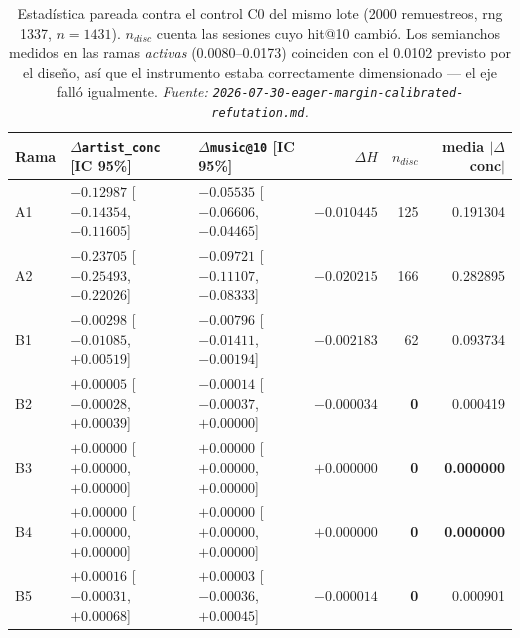 \documentclass[11pt]{article}
\newcommand{\best}[1]{\textbf{#1}}
\begin{document}
\begin{table}[ht]
  \centering
  \caption{Estadística pareada contra el control C0 del mismo lote (\num{2000}
  remuestreos, rng \num{1337}, $n=\num{1431}$). $n_{disc}$ cuenta las sesiones cuyo
  hit@10 cambió. Los semianchos medidos en las ramas \emph{activas}
  (\numrange{0.0080}{0.0173}) coinciden con el \num{0.0102} previsto por el
  diseño, así que el instrumento estaba correctamente dimensionado --- el eje
  falló igualmente.
  \emph{Fuente: \texttt{2026-07-30-eager-margin-calibrated-refutation.md}.}}
  \label{tab:nexttrack-eagermargin-paired}
  {\footnotesize\setlength{\tabcolsep}{4.5pt}\begin{tabular}{lllrrr}
    \toprule
    Rama & $\Delta$\texttt{artist\_conc} [IC 95\%] & $\Delta$\texttt{music@10} [IC 95\%] & $\Delta H$ & $n_{disc}$ & media $|\Delta$conc$|$ \\
    \midrule
    A1 & $-0.12987$ [$-0.14354$, $-0.11605$] & $-0.05535$ [$-0.06606$, $-0.04465$] & $-0.010445$ & 125 & 0.191304 \\
    A2 & $-0.23705$ [$-0.25493$, $-0.22026$] & $-0.09721$ [$-0.11107$, $-0.08333$] & $-0.020215$ & 166 & 0.282895 \\
    B1 & $-0.00298$ [$-0.01085$, $+0.00519$] & $-0.00796$ [$-0.01411$, $-0.00194$] & $-0.002183$ & 62 & 0.093734 \\
    B2 & $+0.00005$ [$-0.00028$, $+0.00039$] & $-0.00014$ [$-0.00037$, $+0.00000$] & $-0.000034$ & \best{0} & 0.000419 \\
    B3 & $+0.00000$ [$+0.00000$, $+0.00000$] & $+0.00000$ [$+0.00000$, $+0.00000$] & $+0.000000$ & \best{0} & \best{0.000000} \\
    B4 & $+0.00000$ [$+0.00000$, $+0.00000$] & $+0.00000$ [$+0.00000$, $+0.00000$] & $+0.000000$ & \best{0} & \best{0.000000} \\
    B5 & $+0.00016$ [$-0.00031$, $+0.00068$] & $+0.00003$ [$-0.00036$, $+0.00045$] & $-0.000014$ & \best{0} & 0.000901 \\
    \bottomrule
  \end{tabular}}
\end{table}
\end{document}
